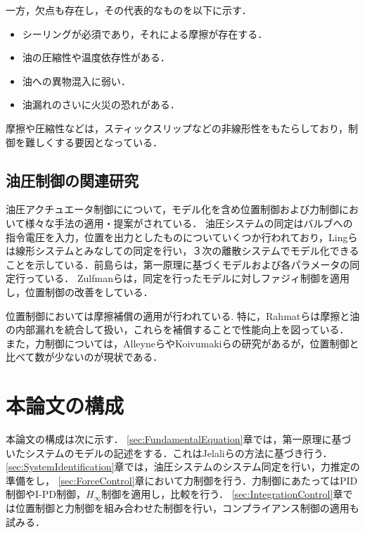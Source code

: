 一方，欠点も存在し，その代表的なものを以下に示す．
\begin{itemize}
    \item シーリングが必須であり，それによる摩擦が存在する．
    \item 油の圧縮性や温度依存性がある．
    \item 油への異物混入に弱い．
    \item 油漏れのさいに火災の恐れがある．
\end{itemize}
摩擦や圧縮性などは，スティックスリップなどの非線形性をもたらしており，制御を難しくする要因となっている\cite{松崎淳1962直動形油圧駆動機構におけるスティックスリップ,de1995new}．


\subsection{油圧制御の関連研究}
油圧アクチュエータ制御にについて，モデル化を含め位置制御および力制御において様々な手法の適用・提案がされている．
油圧システムの同定はバルブへの指令電圧を入力，位置を出力としたものについていくつか行われており，Lingらは線形システムとみなしての同定を行い，３次の離散システムでモデル化できることを示している\cite{ling2012system}．前島らは，第一原理に基づくモデルおよび各パラメータの同定\cite{前島祐三2011,前島祐三2014}行っている．
Zulfmanらは，同定を行ったモデルに対しファジィ制御を適用し，位置制御の改善をしている\cite{zheng2009application}．

位置制御においては摩擦補償の適用が行われている\cite{jianyong2012robust,rahmat2011modeling,lischinsky1999friction}.
特に，Rahmatらは摩擦と油の内部漏れを統合して扱い，これらを補償することで性能向上を図っている\cite{rahmat2011modeling}．
また，力制御については，AlleyneらやKoivumakiらの研究があるが，位置制御と比べて数が少ないのが現状である\cite{Alleyne,koivumaki2015stability}．



\section{本論文の構成}
本論文の構成は次に示す．
\ref{sec:FundamentalEquation}章では，第一原理に基づいたシステムのモデルの記述をする．これはJelaliらの方法\cite{jelali2012hydraulic}に基づき行う．
\ref{sec:SystemIdentification}章では，油圧システムのシステム同定を行い，力推定の準備をし，
\ref{sec:ForceControl}章において力制御を行う．力制御にあたってはPID制御やI-PD制御，$H_\infty$制御を適用し，比較を行う．
\ref{sec:IntegrationControl}章では位置制御と力制御を組み合わせた制御を行い，コンプライアンス制御の適用も試みる．
